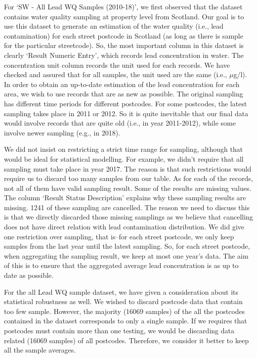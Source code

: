 \documentclass[11pt,twoside]{article}
\numberwithin{Theorem}{section}
\numberwithin{Definition}{section}
\numberwithin{Lemma}{section}
\numberwithin{Algorithm}{section}
\numberwithin{equation}{section}
\begin{document}
For `SW - All Lead WQ Samples (2010-18)', we first observed that the dataset contains water quality sampling at property level from Scotland. Our goal is to use this dataset to generate an estimation of the water quality (i.e., lead contamination) for each street postcode in Scotland (as long as there is sample for the particular streetcode). So, the most important column in this dataset is clearly `Result Numeric Entry', which records lead concentration in water. The concentration unit column records the unit used for each records. We have checked and assured that for all samples, the unit used are the same (i.e., $\mu$g/l).
In order to obtain an up-to-date estimation of the lead concentration for each area, we wish to use records that are as new as possible. The original sampling has different time periods for different postcodes. For some postcodes, the latest sampling takes place in 2011 or 2012. So it is quite inevitable that our final data would involve records that are quite old (i.e., in year 2011-2012), while some involve newer sampling (e.g., in 2018).

We did not insist on restricting a strict time range for sampling, although that would be ideal for statistical modelling. For example, we didn't require that all sampling must take place in year 2017. The reason is that such restrictions would require us to discard too many samples from our table.
As for each of the records, not all of them have valid sampling result. Some of the results are missing values. The column `Result Status Description' explains why these sampling results are missing. 1241 of these sampling are cancelled. The reason we need to discuss this is that we directly discarded those missing samplings as we believe that cancelling does not have direct relation with lead contamination distribution. We did give one restriction over sampling, that is--for each street postcode, we only keep samples from the last year until the latest sampling. So, for each street postcode, when aggregating the sampling result, we keep at most one year's data. The aim of this is to ensure that the aggregated average lead concentration is as up to date as possible.

For the all Lead WQ sample dataset, we have given a consideration about its statistical robustness as well. We wished to discard postcode data that contain too few sample. However, the majority (16069 samples) of the all the postcodes contained in the dataset corresponds to only a single sample. If we requires that postcodes must contain more than one testing, we would be discarding data related (16069 samples) of all postcodes. Therefore, we consider it better to keep all the sample averages.
\end{document}
